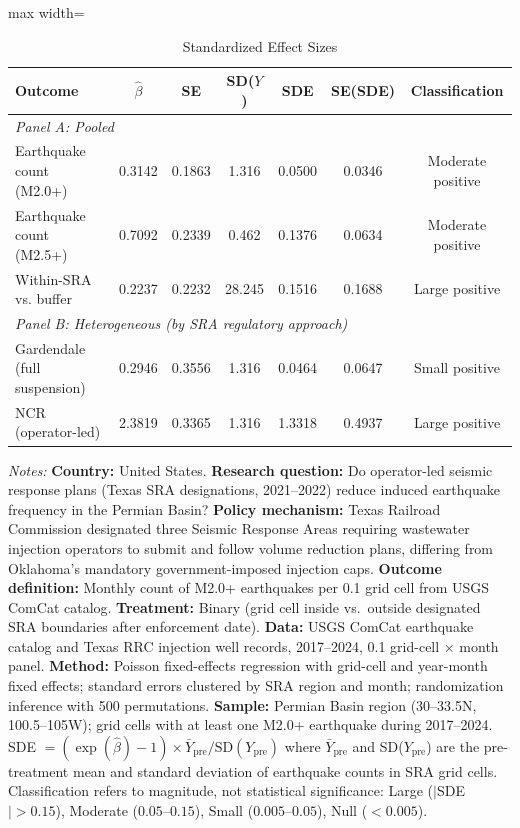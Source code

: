 \begin{table}[htbp]
\centering
\caption{Standardized Effect Sizes}
\label{tab:sde}
\begin{adjustbox}{max width=\textwidth}
\begin{threeparttable}
\begin{tabular}{lcccccc}
\toprule
Outcome & $\hat{\beta}$ & SE & SD($Y$) & SDE & SE(SDE) & Classification \\
\midrule
\multicolumn{7}{l}{\textit{Panel A: Pooled}} \\
Earthquake count (M2.0+) & 0.3142 & 0.1863 & 1.316 & 0.0500 & 0.0346 & Moderate positive \\
Earthquake count (M2.5+) & 0.7092 & 0.2339 & 0.462 & 0.1376 & 0.0634 & Moderate positive \\
Within-SRA vs. buffer & 0.2237 & 0.2232 & 28.245 & 0.1516 & 0.1688 & Large positive \\
[0.5em]
\multicolumn{7}{l}{\textit{Panel B: Heterogeneous (by SRA regulatory approach)}} \\
Gardendale (full suspension) & 0.2946 & 0.3556 & 1.316 & 0.0464 & 0.0647 & Small positive \\
NCR (operator-led) & 2.3819 & 0.3365 & 1.316 & 1.3318 & 0.4937 & Large positive \\
\bottomrule
\end{tabular}
\begin{tablenotes}[flushleft]\footnotesize
\item \textit{Notes:} \textbf{Country:} United States.
\textbf{Research question:} Do operator-led seismic response plans (Texas SRA designations, 2021--2022) reduce induced earthquake frequency in the Permian Basin?
\textbf{Policy mechanism:} Texas Railroad Commission designated three Seismic Response Areas requiring wastewater injection operators to submit and follow volume reduction plans, differing from Oklahoma's mandatory government-imposed injection caps.
\textbf{Outcome definition:} Monthly count of M2.0+ earthquakes per 0.1\textdegree{} grid cell from USGS ComCat catalog.
\textbf{Treatment:} Binary (grid cell inside vs.\ outside designated SRA boundaries after enforcement date).
\textbf{Data:} USGS ComCat earthquake catalog and Texas RRC injection well records, 2017--2024, 0.1\textdegree{} grid-cell $\times$ month panel.
\textbf{Method:} Poisson fixed-effects regression with grid-cell and year-month fixed effects; standard errors clustered by SRA region and month; randomization inference with 500 permutations.
\textbf{Sample:} Permian Basin region (30--33.5\textdegree{}N, 100.5--105\textdegree{}W); grid cells with at least one M2.0+ earthquake during 2017--2024.
SDE $= (\exp(\hat{\beta}) - 1) \times \bar{Y}_{\text{pre}} / \text{SD}(Y_{\text{pre}})$ where $\bar{Y}_{\text{pre}}$ and SD($Y_{\text{pre}}$) are the pre-treatment mean and standard deviation of earthquake counts in SRA grid cells.
Classification refers to magnitude, not statistical significance: Large ($|$SDE$| > 0.15$), Moderate ($0.05$--$0.15$), Small ($0.005$--$0.05$), Null ($< 0.005$).
\end{tablenotes}
\end{threeparttable}
\end{adjustbox}
\end{table}
